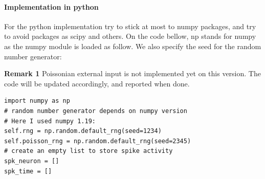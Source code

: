 \documentclass[11pt]{scrartcl}
\begin{document}
\paragraph{Implementation in python}

For the python implementation try to stick at most to numpy packages, and try to avoid packages as scipy and others. On the code bellow, np stands for numpy as the numpy module is loaded as follow. We also specify the seed for the random number generator: 

\textbf{Remark 1} Poissonian external input is not implemented yet on this version. The code will be updated accordingly, and reported when done.

\begin{verbatim}
import numpy as np
# random number generator depends on numpy version
# Here I used numpy 1.19:
self.rng = np.random.default_rng(seed=1234)
self.poisson_rng = np.random.default_rng(seed=2345)
# create an empty list to store spike activity
spk_neuron = []
spk_time = []
\end{verbatim}
\end{document}
